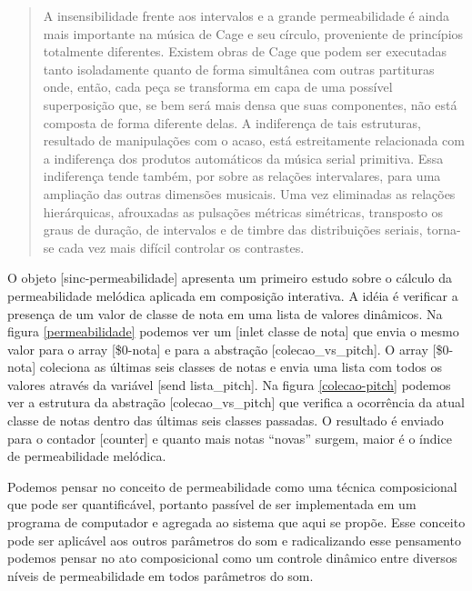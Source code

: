 \documentclass{ppgmus}
\begin{document}
\begin{quote}
  A insensibilidade frente aos intervalos e a grande permeabilidade é
  ainda mais importante na música de Cage e seu círculo, proveniente
  de princípios totalmente diferentes. Existem obras de Cage que podem
  ser executadas tanto isoladamente quanto de forma simultânea com
  outras partituras onde, então, cada peça se transforma em capa de
  uma possível superposição que, se bem será mais densa que suas
  componentes, não está composta de forma diferente delas. A
  indiferença de tais estruturas, resultado de manipulações com o
  acaso, está estreitamente relacionada com a indiferença dos produtos
  automáticos da música serial primitiva. Essa indiferença tende
  também, por sobre as relações intervalares, para uma ampliação das
  outras dimensões musicais. Uma vez eliminadas as relações
  hierárquicas, afrouxadas as pulsações métricas simétricas,
  transposto os graus de duração, de intervalos e de timbre das
  distribuições seriais, torna-se cada vez mais difícil controlar os
  contrastes. \cite{ligeti58:transformacoes}
\end{quote}


O objeto [sinc-permeabilidade] apresenta um primeiro estudo sobre 
o cálculo da permeabilidade melódica aplicada em composição interativa.
A idéia é verificar a presença de um valor de classe de nota em uma lista
de valores dinâmicos. Na figura \ref{permeabilidade} podemos ver um [inlet classe de nota]
que envia o mesmo valor para o array [\$0-nota] e para a abstração [colecao\_vs\_pitch].
O array [\$0-nota] coleciona as últimas seis classes de notas e envia uma lista com
todos os valores através da variável [send lista\_pitch]. Na figura \ref{colecao-pitch}
podemos ver a estrutura da abstração [colecao\_vs\_pitch] que verifica a ocorrência
da atual classe de notas dentro das últimas seis classes passadas. O resultado é enviado
para o contador [counter] e quanto mais notas ``novas'' surgem, maior é o índice de 
permeabilidade melódica.


Podemos pensar no conceito de permeabilidade como uma técnica composicional
que pode ser quantificável, portanto passível de ser implementada em um programa
de computador e agregada ao sistema que aqui se propõe. Esse conceito pode ser
aplicável aos outros parâmetros do som e radicalizando esse pensamento podemos
pensar no ato composicional como um controle dinâmico entre diversos níveis de 
permeabilidade em todos parâmetros do som.
\end{document}
